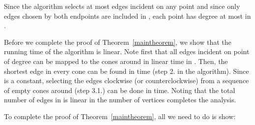 \documentclass{stacs_proc}
\theoremstyle{plain}\newtheorem{satz}[thm]{Satz}
\begin{document}
Since the algorithm selects at most  edges incident on any point
 and since only edges chosen by both endpoints are included in ,
each point has degree at most  in .

Before we complete the proof of Theorem~\ref{maintheorem}, we show that the
running time of the algorithm is linear. Note first that all edges incident
on point  of degree  can be mapped to the  cones around  in
linear time in . Then, the shortest edge in every cone can be found in
time  (step 2. in the algorithm). Since  is a constant, selecting
the  edges clockwise (or counterclockwise) from a sequence of 
empty cones around  (step 3.1.) can be done in  time. Noting that
the total number of edges in  is linear in the number of vertices completes
the analysis.

To complete the proof of Theorem~\ref{maintheorem}, all we need to do is show:
\end{document}
